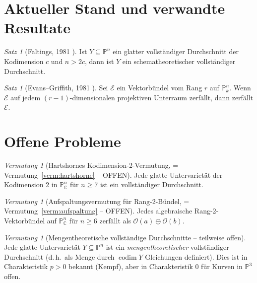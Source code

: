 \documentclass[12pt,a4paper]{amsart}
\theoremstyle{definition}
\theoremstyle{remark}
\newtheorem{satz}[theorem]{Satz}
\newtheorem{vermutung}[theorem]{Vermutung}
\DeclareMathOperator{\codim}{codim}
\newcommand{\PP}{\mathbb{P}}
\newcommand{\CC}{\mathbb{C}}
\newcommand{\OO}{\mathcal{O}}
\begin{document}
\section{Aktueller Stand und verwandte Resultate}

\begin{satz}[Faltings, 1981 \cite{Faltings1981}]
Ist $Y \subseteq \PP^n$ ein glatter vollständiger Durchschnitt der
Kodimension $c$ und $n > 2c$, dann ist $Y$ ein schematheoretischer
vollständiger Durchschnitt.
\end{satz}

\begin{satz}[Evans--Griffith, 1981 \cite{EvansGriffith1981}]
Sei $\mathcal{E}$ ein Vektorbündel vom Rang $r$ auf $\PP^n_k$.
Wenn $\mathcal{E}$ auf jedem $(r-1)$-dimensionalen projektiven Unterraum
zerfällt, dann zerfällt $\mathcal{E}$.
\end{satz}

\section{Offene Probleme}

\begin{vermutung}[Hartshornes Kodimension-2-Vermutung, = Vermutung~\ref{verm:hartshorne} -- OFFEN]
Jede glatte Untervarietät der Kodimension 2 in $\PP^n_\CC$ für $n \ge 7$
ist ein vollständiger Durchschnitt.
\end{vermutung}

\begin{vermutung}[Aufspaltungsvermutung für Rang-2-Bündel, = Vermutung~\ref{verm:aufspaltung} -- OFFEN]
Jedes algebraische Rang-2-Vektorbündel auf $\PP^n_\CC$ für $n \ge 6$
zerfällt als $\OO(a) \oplus \OO(b)$.
\end{vermutung}

\begin{vermutung}[Mengentheoretische vollständige Durchschnitte -- teilweise offen]
Jede glatte Untervarietät $Y \subseteq \PP^n$ ist ein \emph{mengentheoretischer}
vollständiger Durchschnitt (d.\,h.\ als Menge durch $\codim Y$ Gleichungen
definiert).  Dies ist in Charakteristik $p > 0$ bekannt (Kempf), aber in
Charakteristik 0 für Kurven in $\PP^3$ offen.
\end{vermutung}
\end{document}
